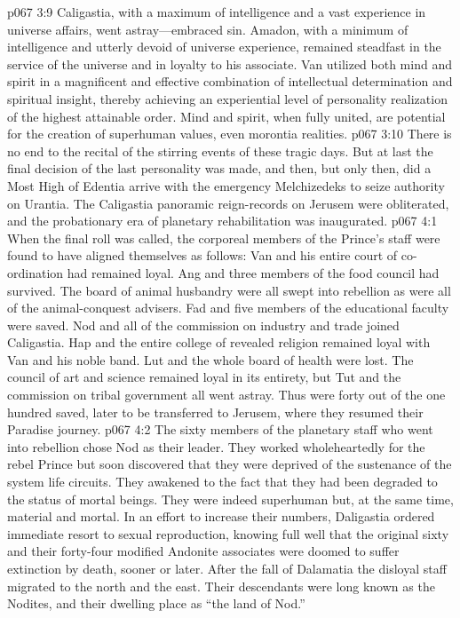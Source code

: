 \vs p067 3:9 Caligastia, with a maximum of intelligence and a vast experience in universe affairs, went astray---embraced sin. Amadon, with a minimum of intelligence and utterly devoid of universe experience, remained steadfast in the service of the universe and in loyalty to his associate. Van utilized both mind and spirit in a magnificent and effective combination of intellectual determination and spiritual insight, thereby achieving an experiential level of personality realization of the highest attainable order. Mind and spirit, when fully united, are potential for the creation of superhuman values, even morontia realities.
\vs p067 3:10 There is no end to the recital of the stirring events of these tragic days. But at last the final decision of the last personality was made, and then, but only then, did a Most High of Edentia arrive with the emergency Melchizedeks to seize authority on Urantia. The Caligastia panoramic reign\hyp{}records on Jerusem were obliterated, and the probationary era of planetary rehabilitation was inaugurated.
\vs p067 4:1 When the final roll was called, the corporeal members of the Prince’s staff were found to have aligned themselves as follows: Van and his entire court of co\hyp{}ordination had remained loyal. Ang and three members of the food council had survived. The board of animal husbandry were all swept into rebellion as were all of the animal\hyp{}conquest advisers. Fad and five members of the educational faculty were saved. Nod and all of the commission on industry and trade joined Caligastia. Hap and the entire college of revealed religion remained loyal with Van and his noble band. Lut and the whole board of health were lost. The council of art and science remained loyal in its entirety, but Tut and the commission on tribal government all went astray. Thus were forty out of the one hundred saved, later to be transferred to Jerusem, where they resumed their Paradise journey.
\vs p067 4:2 The sixty members of the planetary staff who went into rebellion chose Nod as their leader. They worked wholeheartedly for the rebel Prince but soon discovered that they were deprived of the sustenance of the system life circuits. They awakened to the fact that they had been degraded to the status of mortal beings. They were indeed superhuman but, at the same time, material and mortal. In an effort to increase their numbers, Daligastia ordered immediate resort to sexual reproduction, knowing full well that the original sixty and their forty\hyp{}four modified Andonite associates were doomed to suffer extinction by death, sooner or later. After the fall of Dalamatia the disloyal staff migrated to the north and the east. Their descendants were long known as the Nodites, and their dwelling place as “the land of Nod.”
